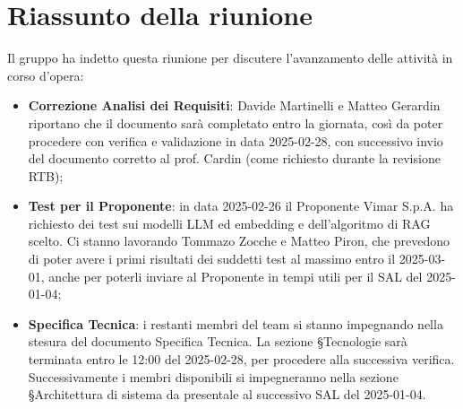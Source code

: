\section{Riassunto della riunione}
Il gruppo ha indetto questa riunione per discutere l'avanzamento delle attività in corso d'opera:
\begin{itemize}
    \item \textbf{Correzione Analisi dei Requisiti}: Davide Martinelli e Matteo Gerardin riportano che il documento sarà completato entro la giornata, così da poter procedere con verifica e validazione in data 2025-02-28, con successivo invio del documento corretto al prof. Cardin (come richiesto durante la revisione RTB);
    \item \textbf{Test per il Proponente}: in data 2025-02-26 il Proponente Vimar S.p.A. ha richiesto dei test sui modelli LLM ed embedding e dell'algoritmo di RAG scelto. Ci stanno lavorando Tommazo Zocche e Matteo Piron, che prevedono di poter avere i primi risultati dei suddetti test al massimo entro il 2025-03-01, anche per poterli inviare al Proponente in tempi utili per il SAL del 2025-01-04;
    \item \textbf{Specifica Tecnica}: i restanti membri del team si stanno impegnando nella stesura del documento Specifica Tecnica. La sezione §Tecnologie sarà terminata entro le 12:00 del 2025-02-28, per procedere alla successiva verifica. Successivamente i membri disponibili si impegneranno nella sezione §Architettura di sistema da presentale al successivo SAL del 2025-01-04.

\end{itemize}